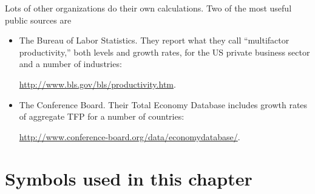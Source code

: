 Lots of other organizations do their own calculations.
Two of the most useful public sources are
\begin{itemize}
\item The Bureau of Labor Statistics.
They  report what they call
``multifactor productivity,'' both levels and growth rates,
for the US private business sector and a number of industries:

\vspace*{\parskip}
\centerline{\url{http://www.bls.gov/bls/productivity.htm}.}

\item The Conference Board.  Their Total Economy Database includes
growth rates of aggregate TFP for a number of countries:

\vspace*{\parskip}
\centerline{\phantom{xxxxx}\url{http://www.conference-board.org/data/economydatabase/}.}
\end{itemize}

\begin{comment}
MBA 11 alum Matthew Cedergren
supplies these
links to interactive graphs of Cobb-Douglas   production functions:
%
\begin{itemize}
\item  Manfred Gartner's
\href{http://www.fgn.unisg.ch/eurmacro/tutor/Cobb-Douglas  .html}
{eurmacro site}.

\item
\href{http://demonstrations.wolfram.com/CobbDouglasProductionFunctions/}
{Wolfram demonstrations}.

\end{itemize}
\end{comment}


\section*{Symbols used in this chapter}

